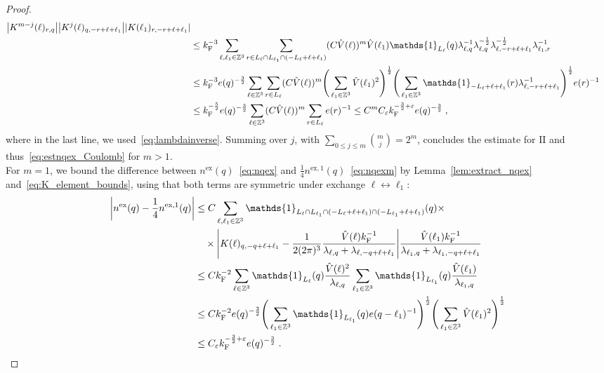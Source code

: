 \documentclass[12pt,a4paper]{article}
\numberwithin{equation}{section}
\newcommand{\1}{\mathbb{I}}
\newcommand{\ex}{\mathrm{ex}}
\newcommand{\F}{\mathrm{F}}
\newcommand{\II}{\mathrm{II}}
\newcommand{\Zstar}{\mathbb{Z}^3} %
\newcommand{\Z}{\mathbb{Z}}
\newcommand{\half}{\frac{1}{2}}
\theoremstyle{plain}
\theoremstyle{definition}
\theoremstyle{remark}
\theoremstyle{plain}
\theoremstyle{definition}
\theoremstyle{remark}
\begin{document}
\begin{proof}
\begin{align}
		\abs{K^{m-j}(\ell)_{r,q}}
		\abs{K^j(\ell)_{q,-r+\ell+\ell_1}}
		\abs{K(\ell_1)_{r,-r+\ell+\ell_1}} \nonumber\\
	&\leq k_{\F}^{-3} \sum_{\ell,\ell_1 \in \Zstar} \sum_{r \in L_\ell \cap L_{\ell_1} \cap (-L_{\ell}+\ell+\ell_1)}
		(C \hat{V}(\ell))^m \hat{V}(\ell_1)
		\mathds{1}_{L_\ell}(q)
		\lambda_{\ell,q}^{-1} \lambda_{\ell,q}^{-\half} \lambda_{\ell,-r+\ell+\ell_1}^{-\half} \lambda_{\ell_1,r}^{-1} \nonumber\\
	&\leq k_{\F}^{-3} e(q)^{-\frac 32} \sum_{\ell \in \Zstar} \sum_{r \in L_\ell}
		(C \hat{V}(\ell))^m
		\Bigg( \sum_{\ell_1 \in \Zstar} \hat{V}(\ell_1)^2  \Bigg)^{\half}
		\Bigg( \sum_{\ell_1 \in \Z^3} \mathds{1}_{-L_{\ell}+\ell+\ell_1}(r) \lambda_{\ell,-r+\ell+\ell_1}^{-1} \Bigg)^{\half}
		 e(r)^{-1} \nonumber\\
	&\leq k_{\F}^{-\frac 52} e(q)^{-\frac 32} \sum_{\ell \in \Zstar} (C \hat{V}(\ell))^m
	\sum_{r \in L_\ell} e(r)^{-1}
	\leq C^m C_\varepsilon k_{\F}^{-\frac 32 + \varepsilon} e(q)^{-\frac 32} \;,
\end{align}
where in the last line, we used~\eqref{eq:lambdainverse}. Summing over $ j $, with $ \sum_{0 \le j \le m} {{m}\choose j} = 2^m $, concludes the estimate for $ \II $ and thus~\eqref{eq:estnqex_Coulomb} for $ m > 1 $.\\
For $ m = 1 $, we bound the difference between $ n^{\ex}(q) $~\eqref{eq:nqex} and $ \frac 14 n^{\ex,1}(q) $~\eqref{eq:nqexm} by Lemma~\ref{lem:extract_nqex} and~\eqref{eq:K_element_bounds}, using that both terms are symmetric under exchange $ \ell \leftrightarrow \ell_1 $:
\begin{align*}
	\abs{n^{\ex}(q) - \frac 14 n^{\ex,1}(q)}
	&\leq C \sum_{\ell,\ell_1 \in \Zstar} 
		\mathds{1}_{L_\ell \cap L_{\ell_1} \cap (-L_{\ell}+\ell+\ell_1) \cap (-L_{\ell_1}+\ell+\ell_1)}(q) \times \nonumber\\
	&\quad \times \abs{K(\ell)_{q,-q+\ell+\ell_1}
		- \frac{1}{2 (2 \pi)^3} \frac{\hat{V}(\ell) k_{\F}^{-1}}{\lambda_{\ell,q} + \lambda_{\ell,-q+\ell+\ell_1}}}
		\frac{\hat{V}(\ell_1) k_{\F}^{-1}}{\lambda_{\ell_1,q} + \lambda_{\ell_1,-q+\ell+\ell_1}} \nonumber\\
	&\leq C k_{\F}^{-2} \sum_{\ell \in \Zstar} \mathds{1}_{L_\ell}(q)
		\frac{\hat{V}(\ell)^2}{\lambda_{\ell,q}}
		\sum_{\ell_1 \in \Zstar} \mathds{1}_{L_{\ell_1}}(q)
		\frac{\hat{V}(\ell_1)}{\lambda_{\ell_1,q}} \nonumber\\
	&\leq C k_{\F}^{-2} e(q)^{-\frac 32}
		\Bigg( \sum_{\ell_1 \in \Zstar} \mathds{1}_{L_{\ell_1}}(q) e(q-\ell_1)^{-1} \Bigg)^{\half}
		\Bigg( \sum_{\ell_1 \in \Zstar} \hat{V}(\ell_1)^2 \Bigg)^{\half} \nonumber\\
	&\leq C_\varepsilon k_{\F}^{-\frac 32 + \varepsilon} e(q)^{-\frac 32} \;.
\end{align*}


\end{proof}
\end{document}
